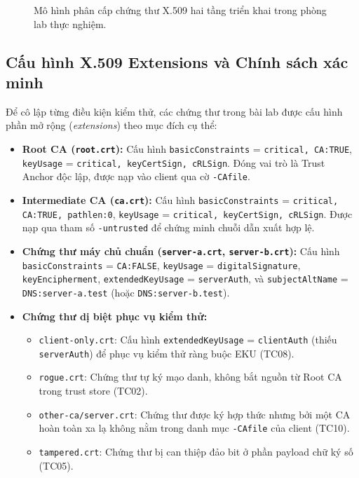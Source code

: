 \begin{figure}[!htbp]
\centering

\caption{Mô hình phân cấp chứng thư X.509 hai tầng triển khai trong phòng lab thực nghiệm.}
\label{fig:lab-pki-hierarchy}
\end{figure}

\subsection{Cấu hình X.509 Extensions và Chính sách xác minh}
\label{subsec:x509-extensions-policy}
Để cô lập từng điều kiện kiểm thử, các chứng thư trong bài lab được cấu hình phần mở rộng (\textit{extensions}) theo mục đích cụ thể:
{\sloppy
\begin{itemize}
    \item \textbf{Root CA (\texttt{root.crt}):} Cấu hình \texttt{basicConstraints} = \texttt{critical, CA:TRUE}, \texttt{keyUsage} = \texttt{critical, keyCertSign, cRLSign}. Đóng vai trò là Trust Anchor độc lập, được nạp vào client qua cờ \texttt{-CAfile}.
    \item \textbf{Intermediate CA (\texttt{ca.crt}):} Cấu hình \texttt{basicConstraints} = \texttt{critical, CA:TRUE, pathlen:0}, \texttt{keyUsage} = \texttt{critical, keyCertSign, cRLSign}. Được nạp qua tham số \texttt{-untrusted} để chứng minh chuỗi dẫn xuất hợp lệ.
    \item \textbf{Chứng thư máy chủ chuẩn (\texttt{server-a.crt}, \texttt{server-b.crt}):} Cấu hình \texttt{basicConstraints} = \texttt{CA:FALSE}, \texttt{keyUsage} = \texttt{digitalSignature}, \texttt{keyEncipherment}, \texttt{extendedKeyUsage} = \texttt{serverAuth}, và \texttt{subjectAltName} = \texttt{DNS:server-a.test} (hoặc \texttt{DNS:server-b.test}).
    \item \textbf{Chứng thư dị biệt phục vụ kiểm thử:}
    \begin{itemize}
        \item \texttt{client-only.crt}: Cấu hình \texttt{extendedKeyUsage} = \texttt{clientAuth} (thiếu \texttt{serverAuth}) để phục vụ kiểm thử ràng buộc EKU (TC08).
        \item \texttt{rogue.crt}: Chứng thư tự ký mạo danh, không bắt nguồn từ Root CA trong trust store (TC02).
        \item \texttt{other-ca/server.crt}: Chứng thư được ký hợp thức nhưng bởi một CA hoàn toàn xa lạ không nằm trong danh mục \texttt{-CAfile} của client (TC10).
        \item \texttt{tampered.crt}: Chứng thư bị can thiệp đảo bit ở phần payload chữ ký số (TC05).
    \end{itemize}
\end{itemize}
}

